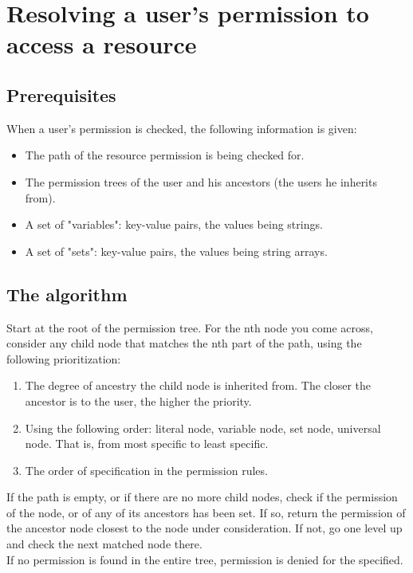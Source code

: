 \documentclass{article}
\begin{document}
	\section{Resolving a user's permission to access a resource}
	\subsection{Prerequisites}
	When a user's permission is checked, the following information is given:
	\begin{itemize}
		\item The path of the resource permission is being checked for.
		\item The permission trees of the user and his ancestors (the users he inherits from).
		\item A set of "variables": key-value pairs, the values being strings.
		\item A set of "sets": key-value pairs, the values being string arrays.
	\end{itemize}

	\subsection{The algorithm}
	Start at the root of the permission tree. For the nth node you come across, consider any child node that matches the nth part of the path, using the following prioritization:
	\begin{enumerate}
		\item The degree of ancestry the child node is inherited from. The closer the ancestor is to the user, the higher the priority.
		\item Using the following order: literal node, variable node, set node, universal node. That is, from most specific to least specific.
		\item The order of specification in the permission rules.
	\end{enumerate}
	If the path is empty, or if there are no more child nodes, check if the permission of the node, or of any of its ancestors has been set. If so, return the permission of the ancestor node closest to the node under consideration. If not, go one level up and check the next matched node there.\\
	If no permission is found in the entire tree, permission is denied for the specified.
\end{document}
